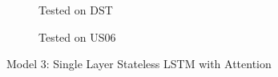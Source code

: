 \begin{figure}[htbp]
    \hfill
    \begin{subfigure}[b]{0.325\textwidth}
        \centering
        
        \caption{Tested on DST}
    \end{subfigure}
    \hfill
    \begin{subfigure}[b]{0.325\textwidth}
        \centering
        
        \caption{Tested on US06}
    \end{subfigure}
    \caption{Model 3: Single Layer Stateless LSTM with Attention}
    \label{fig:Model-3res}
\end{figure}
